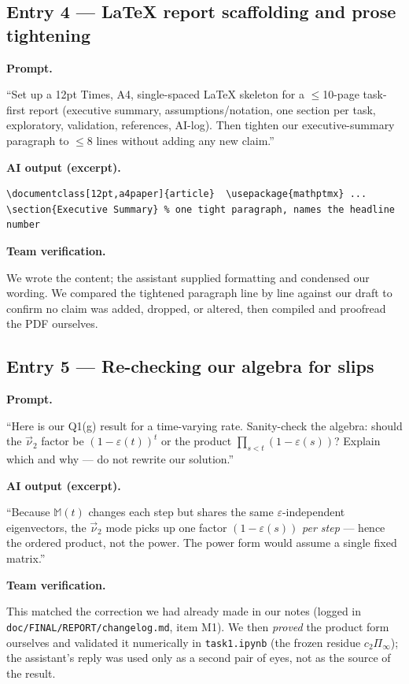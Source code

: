 \documentclass[11pt,a4paper]{article}
\newcommand{\logentry}[1]{\subsection*{#1}}
\begin{document}
\logentry{Entry 4 --- \LaTeX{} report scaffolding and prose tightening}
\textbf{Prompt.}
\begin{promptbox}
``Set up a 12pt Times, A4, single-spaced \LaTeX{} skeleton for a $\le$10-page task-first report
(executive summary, assumptions/notation, one section per task, exploratory, validation,
references, AI-log). Then tighten our executive-summary paragraph to $\le$8 lines without adding
any new claim.''
\end{promptbox}
\textbf{AI output (excerpt).}
\begin{outbox}
\begin{lstlisting}
\documentclass[12pt,a4paper]{article}  \usepackage{mathptmx} ...
\section{Executive Summary} % one tight paragraph, names the headline number
\end{lstlisting}
\end{outbox}
\textbf{Team verification.}
\begin{verbox}
We wrote the content; the assistant supplied formatting and condensed our wording. We compared
the tightened paragraph line by line against our draft to confirm no claim was added, dropped, or
altered, then compiled and proofread the PDF ourselves.
\end{verbox}

\logentry{Entry 5 --- Re-checking our algebra for slips}
\textbf{Prompt.}
\begin{promptbox}
``Here is our Q1(g) result for a time-varying rate. Sanity-check the algebra: should the
$\vec\nu_2$ factor be $(1-\varepsilon(t))^{t}$ or the product $\prod_{s<t}(1-\varepsilon(s))$?
Explain which and why --- do not rewrite our solution.''
\end{promptbox}
\textbf{AI output (excerpt).}
\begin{outbox}
``Because $\mathbb M(t)$ changes each step but shares the same $\varepsilon$-independent
eigenvectors, the $\vec\nu_2$ mode picks up one factor $(1-\varepsilon(s))$ \emph{per step} ---
hence the ordered product, not the power. The power form would assume a single fixed matrix.''
\end{outbox}
\textbf{Team verification.}
\begin{verbox}
This matched the correction we had already made in our notes (logged in
\texttt{doc/FINAL/REPORT/changelog.md}, item M1). We then \emph{proved} the product form
ourselves and validated it numerically in \texttt{task1.ipynb} (the frozen residue
$c_2\Pi_\infty$); the assistant's reply was used only as a second pair of eyes, not as the source
of the result.
\end{verbox}
\end{document}
